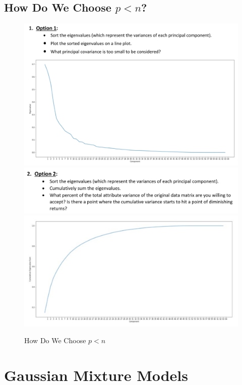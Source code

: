 \documentclass[11pt]{elegantbook}
\begin{document}
\section{How Do We Choose $p<n$?}
\begin{center}\begin{figure}[htbp]
    \centering
    \includegraphics[scale=0.18]{ChooseP.png}
    \includegraphics[scale=0.18]{ChooseP2.png}
    \includegraphics[scale=0.15]{ChooseP3.png}
    \caption{How Do We Choose $p<n$}
    \label{}
\end{figure}\end{center}

\chapter{Gaussian Mixture Models}
\end{document}
